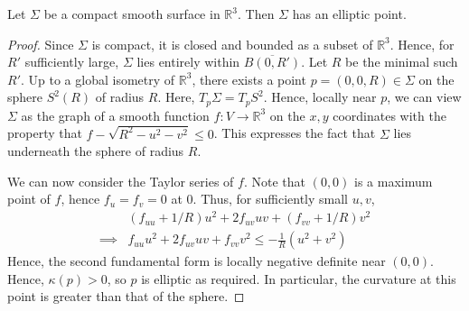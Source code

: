 \documentclass[a4paper]{article}
\begin{document}
\begin{proposition}
	Let \( \Sigma \) be a compact smooth surface in \( \mathbb R^3 \).
	Then \( \Sigma \) has an elliptic point.
\end{proposition}
\begin{proof}
	Since \( \Sigma \) is compact, it is closed and bounded as a subset of \( \mathbb R^3 \).
	Hence, for \( R' \) sufficiently large, \( \Sigma \) lies entirely within \( \overline{B(0,R')} \).
	Let \( R \) be the minimal such \( R' \).
	Up to a global isometry of \( \mathbb R^3 \), there exists a point \( p = (0,0,R) \in \Sigma \) on the sphere \( S^2(R) \) of radius \( R \).
	Here, \( T_p \Sigma = T_p S^2 \).
	Hence, locally near \( p \), we can view \( \Sigma \) as the graph of a smooth function \( f \colon V \to \mathbb R^3 \) on the \( x, y \) coordinates with the property that \( f - \sqrt{R^2 - u^2 - v^2} \leq 0 \).
	This expresses the fact that \( \Sigma \) lies underneath the sphere of radius \( R \).

	We can now consider the Taylor series of \( f \).
	Note that \( (0,0) \) is a maximum point of \( f \), hence \( f_u = f_v = 0 \) at \( 0 \).
	Thus, for sufficiently small \( u,v \),
	\[
		\begin{aligned}
			& (f_{uu} + 1/R) u^2 + 2f_{uv} uv + (f_{vv} + 1/R) v^2 \\ 
			\implies & f_{uu} u^2 + 2f_{uv} uv + f_{vv} v^2  \leq - \frac{1}{R} (u^2 + v^2)
		\end{aligned}
	\]
	Hence, the second fundamental form is locally negative definite near \( (0,0) \).
	Hence, \( \kappa(p) > 0 \), so \( p \) is elliptic as required.
	In particular, the curvature at this point is greater than that of the sphere.
\end{proof}
\end{document}
